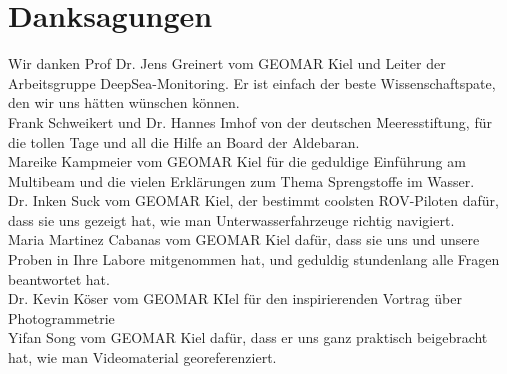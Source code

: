  

\chapter[Danksagungen]{Danksagungen}
Wir danken Prof Dr. Jens Greinert vom GEOMAR Kiel und Leiter der Arbeitsgruppe DeepSea-Monitoring. Er ist einfach der beste Wissenschaftspate, den wir uns hätten wünschen können.\\


Frank Schweikert und Dr. Hannes Imhof von der deutschen Meeresstiftung, für die tollen Tage und all die Hilfe an Board der Aldebaran. \\


Mareike Kampmeier vom GEOMAR Kiel für die geduldige Einführung am Multibeam und die vielen Erklärungen zum Thema Sprengstoffe im Wasser. \\


Dr. Inken Suck vom GEOMAR Kiel, der bestimmt coolsten ROV-Piloten dafür, dass sie uns gezeigt hat, wie man Unterwasserfahrzeuge richtig navigiert. \\


Maria Martinez Cabanas vom GEOMAR Kiel dafür, dass sie uns und unsere Proben in Ihre Labore mitgenommen hat, und geduldig stundenlang alle Fragen beantwortet hat.\\

Dr. Kevin Köser vom GEOMAR KIel für den inspirierenden Vortrag über Photogrammetrie \\


Yifan Song vom GEOMAR Kiel dafür, dass er uns ganz praktisch beigebracht hat, wie man Videomaterial georeferenziert.





